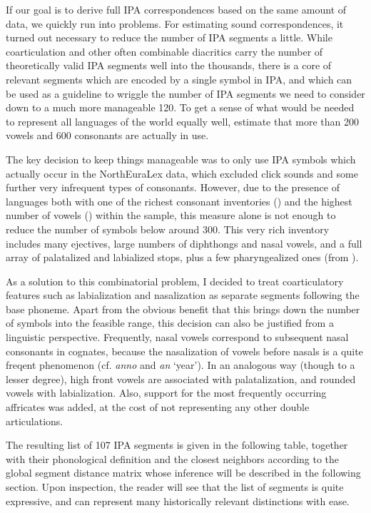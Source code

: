 If our goal is to derive full IPA correspondences based on the same amount of data, we quickly run into problems. For estimating sound correspondences, it turned out necessary to reduce the number of IPA segments a little. While coarticulation and other often combinable diacritics carry the number of theoretically valid IPA segments well into the thousands, there is a core of relevant segments which are encoded by a single symbol in IPA, and which can be used as a guideline to wriggle the number of IPA segments we need to consider down to a much more manageable 120. To get a sense of what would be needed to represent all languages of the world equally well, \cite{ladefoged_maddieson_1996} estimate that more than 200 vowels and 600 consonants are actually in use.

The key decision to keep things manageable was to only use IPA symbols which actually occur in the NorthEuraLex data, which excluded click sounds and some further very infrequent types of consonants. However, due to the presence of languages both with one of the richest consonant inventories () and the highest number of vowels () within the sample, this measure alone is not enough to reduce the number of symbols below around 300. This very rich inventory includes many ejectives, large numbers of diphthongs and nasal vowels, and a full array of palatalized and labialized stops, plus a few pharyngealized ones (from ).

As a solution to this combinatorial problem, I decided to treat coarticulatory features such as labialization and nasalization as separate segments following the base phoneme. Apart from the obvious benefit that this brings down the number of symbols into the feasible range, this decision can also be justified from a linguistic perspective. Frequently, nasal vowels correspond to subsequent nasal consonants in cognates, because the nasalization of vowels before nasals is a quite freqent phenomenon (cf.  \textit{anno} \ipa{[an:o]} and  \textit{an} \ipa{[\~A]} `year'). In an analogous way (though to a lesser degree), high front vowels are associated with palatalization, and rounded vowels with labialization. Also, support for the most frequently occurring affricates was added, at the cost of not representing any other double articulations.

The resulting list of 107 IPA segments is given in the following table, together with their phonological definition and the closest neighbors according to the global segment distance matrix whose inference will be described in the following section. Upon inspection, the reader will see that the list of segments is quite expressive, and can represent many historically relevant distinctions with ease.

